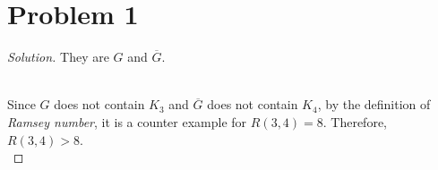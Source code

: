 \section*{Problem 1}
	\begin{proof} [Solution]
		They are $G$ and $\overline{G}$.
		\begin{figure} [!htb]
		\end{figure}\\
		Since $G$ does not contain $K_3$ and $\overline{G}$ does not contain $K_4$, by the definition of \textit{Ramsey number}, it is a counter example for $R(3, 4) = 8$. Therefore, $R(3, 4) > 8$.\\
	\end{proof}